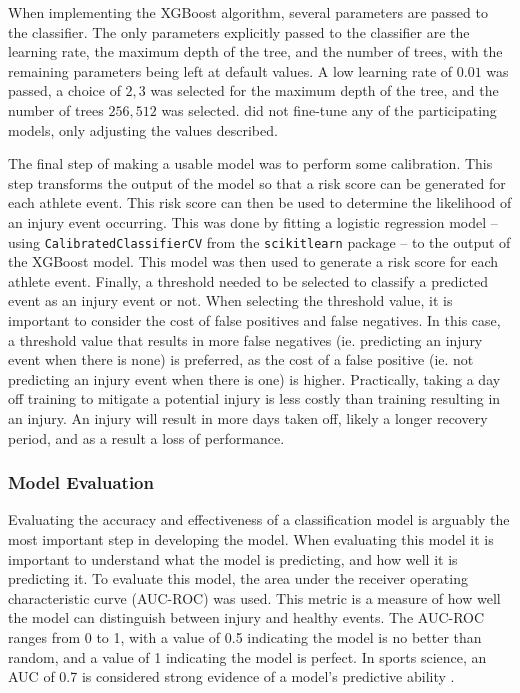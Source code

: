 When implementing the XGBoost algorithm, several parameters are passed to the classifier. The only parameters explicitly passed to the classifier are the learning rate, the maximum depth of the tree, and the number of trees, with the remaining parameters being left at default values. A low learning rate of $0.01$ was passed, a choice of ${2, 3}$ was selected for the maximum depth of the tree, and the number of trees ${256, 512}$ was selected. \textcite{Lovdal2021} did not fine-tune any of the participating models, only adjusting the values described.

The final step of making a usable model was to perform some calibration. This step transforms the output of the model so that a risk score can be generated for each athlete event. This risk score can then be used to determine the likelihood of an injury event occurring. This was done by fitting a logistic regression model -- using \texttt{CalibratedClassifierCV} from the \texttt{scikitlearn} package -- to the output of the XGBoost model. This model was then used to generate a risk score for each athlete event. Finally, a threshold needed to be selected to classify a predicted event as an injury event or not. When selecting the threshold value, it is important to consider the cost of false positives and false negatives. In this case, a threshold value that results in more false negatives (ie. predicting an injury event when there is none) is preferred, as the cost of a false positive (ie. not predicting an injury event when there is one) is higher. Practically, taking a day off training to mitigate a potential injury is less costly than training resulting in an injury. An injury will result in more days taken off, likely a longer recovery period, and as a result a loss of performance. 

\subsubsection{Model Evaluation}
Evaluating the accuracy and effectiveness of a classification model is arguably the most important step in developing the model. When evaluating this model it is important to understand what the model is predicting, and how well it is predicting it. To evaluate this model, the area under the receiver operating characteristic curve (AUC-ROC) was used. This metric is a measure of how well the model can distinguish between injury and healthy events. The AUC-ROC ranges from 0 to 1, with a value of 0.5 indicating the model is no better than random, and a value of 1 indicating the model is perfect. In sports science, an AUC of 0.7 is considered strong evidence of a model's predictive ability \cite{Lovdal2021}. 

